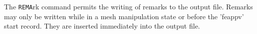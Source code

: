 \headb

The {\tt REMA}rk command permits the writing of remarks to the output file.
Remarks may only be written while in a mesh manipulation state or before
the 'feappv' start record.  They are inserted immediately into the output file.
\vfil\eject
